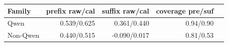 \begin{tabular}{lrrrr}
\toprule
Family & prefix raw/cal & suffix raw/cal & coverage pre/suf \\
\midrule
Qwen & 0.539/0.625 & 0.361/0.440 & 0.94/0.90 \\
Non-Qwen & 0.440/0.515 & -0.090/0.017 & 0.81/0.53 \\
\bottomrule
\end{tabular}
